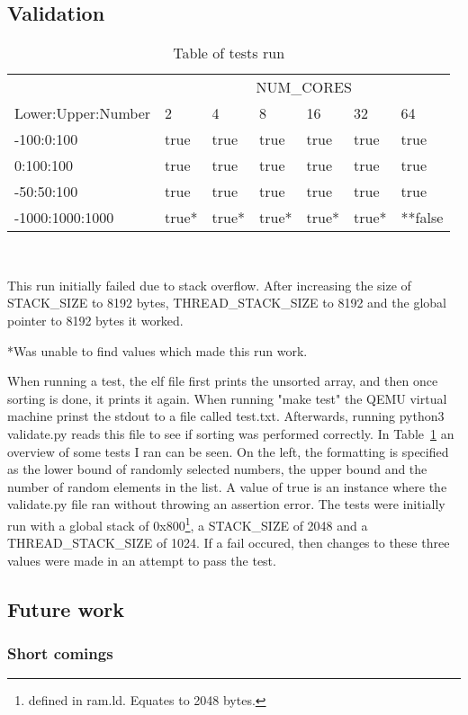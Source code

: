 \subsection{Validation}\label{sec:validate}
\begin{table}
  \caption{Table of tests run}\label{tab:tests}
  \begin{center}
    \begin{tabular}[c]{l|l|l|l|l|l|l}
      & \multicolumn{6}{c}{NUM\_CORES}\\
      \cline{2-7}
      Lower:Upper:Number & 2 & 4 & 8 & 16 & 32 & 64\\
      \hline
      -100:0:100 & true & true & true & true & true & true \\
      \hline
      0:100:100 & true & true & true & true & true & true\\
      \hline
      -50:50:100 & true & true & true & true & true & true \\
      \hline
      -1000:1000:1000 & true* & true* & true* & true* & true* & **false
    \end{tabular} \\
    \vspace{1em}
    \raggedright{\footnotesize *This run initially failed due to stack overflow. After
    increasing the size of STACK\_SIZE to 8192 bytes, THREAD\_STACK\_SIZE to
  8192 and the global pointer to 8192 bytes it worked.} \\
    \raggedright{\footnotesize **Was unable to find values which made this run work.}
  \end{center}
\end{table}

When running a test, the elf file first prints the unsorted array, and then once
sorting is done, it prints it again. When running "make test" the QEMU virtual
machine prinst the stdout to a file called test.txt. Afterwards, running python3
validate.py reads this file to see if sorting was performed correctly. In
Table~\ref{tab:tests} an overview of some tests I ran can be seen. On the left,
the formatting is specified as the lower bound of randomly selected numbers, the
upper bound and the number of random elements in the list. A value of true is
an instance where the validate.py file ran without throwing an assertion error.
The tests were initially run with a global stack of 0x800\footnote{defined in
ram.ld. Equates to 2048 bytes.}, a STACK\_SIZE of 2048 and a THREAD\_STACK\_SIZE
of 1024. If a fail occured, then changes to these three values were made in an
attempt to pass the test.

\subsection{Future work}
\subsubsection*{Short comings}



